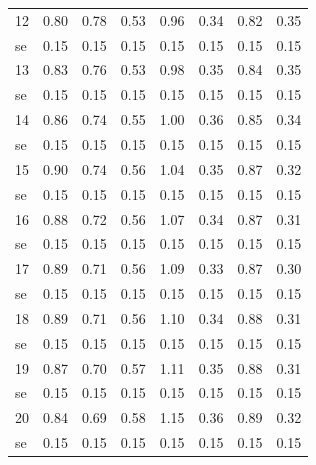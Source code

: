 \documentclass[11pt,preprint, authoryear]{elsarticle}
\numberwithin{equation}{section}
\numberwithin{figure}{section}
\numberwithin{table}{section}
\begin{document}
\begin{longtable}{lrrrrrrr}
  12 & 0.80 & 0.78 & 0.53 & 0.96 & 0.34 & 0.82 & 0.35 \\ 
  se & 0.15 & 0.15 & 0.15 & 0.15 & 0.15 & 0.15 & 0.15 \\ 
  13 & 0.83 & 0.76 & 0.53 & 0.98 & 0.35 & 0.84 & 0.35 \\ 
  se & 0.15 & 0.15 & 0.15 & 0.15 & 0.15 & 0.15 & 0.15 \\ 
  14 & 0.86 & 0.74 & 0.55 & 1.00 & 0.36 & 0.85 & 0.34 \\ 
  se & 0.15 & 0.15 & 0.15 & 0.15 & 0.15 & 0.15 & 0.15 \\ 
  15 & 0.90 & 0.74 & 0.56 & 1.04 & 0.35 & 0.87 & 0.32 \\ 
  se & 0.15 & 0.15 & 0.15 & 0.15 & 0.15 & 0.15 & 0.15 \\ 
  16 & 0.88 & 0.72 & 0.56 & 1.07 & 0.34 & 0.87 & 0.31 \\ 
  se & 0.15 & 0.15 & 0.15 & 0.15 & 0.15 & 0.15 & 0.15 \\ 
  17 & 0.89 & 0.71 & 0.56 & 1.09 & 0.33 & 0.87 & 0.30 \\ 
  se & 0.15 & 0.15 & 0.15 & 0.15 & 0.15 & 0.15 & 0.15 \\ 
  18 & 0.89 & 0.71 & 0.56 & 1.10 & 0.34 & 0.88 & 0.31 \\ 
  se & 0.15 & 0.15 & 0.15 & 0.15 & 0.15 & 0.15 & 0.15 \\ 
  19 & 0.87 & 0.70 & 0.57 & 1.11 & 0.35 & 0.88 & 0.31 \\ 
  se & 0.15 & 0.15 & 0.15 & 0.15 & 0.15 & 0.15 & 0.15 \\ 
  20 & 0.84 & 0.69 & 0.58 & 1.15 & 0.36 & 0.89 & 0.32 \\ 
  se & 0.15 & 0.15 & 0.15 & 0.15 & 0.15 & 0.15 & 0.15 \\ 
   \bottomrule
\end{longtable}
\endgroup
\end{document}
